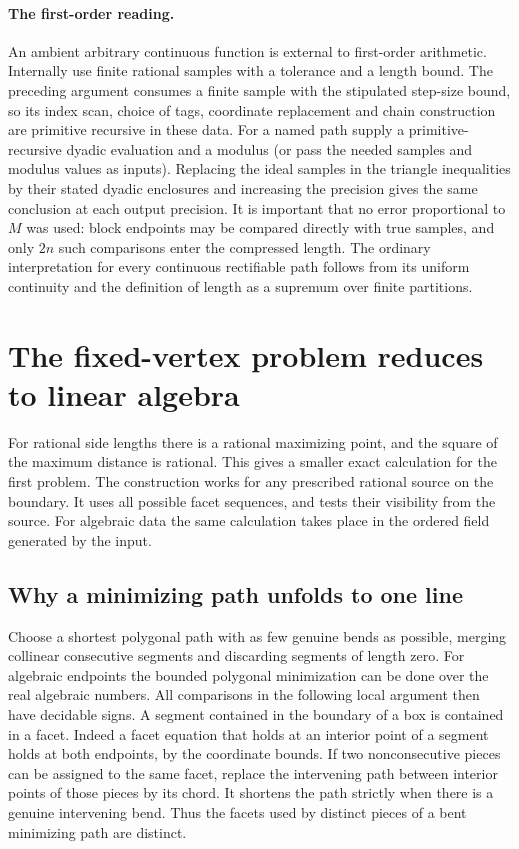 \documentclass[10pt,letterpaper]{article}
\begin{document}
\paragraph{The first-order reading.}
An ambient arbitrary continuous function is external to first-order
arithmetic. Internally use finite rational samples with a tolerance
and a length bound. The preceding argument consumes a finite sample
with the stipulated step-size bound, so its index scan, choice of tags,
coordinate replacement and chain construction are primitive recursive
in these data. For a named path supply a primitive-recursive dyadic
evaluation and a modulus (or pass the needed samples and modulus
values as inputs). Replacing the ideal samples in the triangle
inequalities by their stated dyadic enclosures and increasing the
precision gives the same conclusion at each output precision. It is
important that no error proportional to $M$ was used: block endpoints
may be compared directly with true samples, and only $2n$ such
comparisons enter the compressed length. The ordinary interpretation
for every continuous rectifiable path follows from its uniform
continuity and the definition of length as a supremum over finite
partitions.


\section{The fixed-vertex problem reduces to linear algebra}
\label{sec:fixedarr}
For rational side lengths there is a rational maximizing point, and the
square of the maximum distance is rational. This gives a smaller exact
calculation for the first problem. The construction works for any prescribed
rational source on the boundary. It uses all possible facet sequences, and
tests their visibility from the source. For algebraic data the same
calculation takes place in the ordered field generated by the input.

\subsection{Why a minimizing path unfolds to one line}
Choose a shortest polygonal path with as few genuine bends as possible,
merging collinear consecutive segments and discarding segments of length zero.
For algebraic endpoints the bounded polygonal minimization can be done over
the real algebraic numbers. All comparisons in the following local argument
then have decidable signs.
A segment contained in the boundary of a box is contained in a facet. Indeed a facet equation that holds at an interior point of a segment holds at
both endpoints, by the coordinate bounds. If two nonconsecutive pieces
can be assigned to the same facet, replace the intervening path between
interior points of those pieces by its chord. It shortens the path strictly
when there is a genuine intervening bend. Thus the facets used by distinct
pieces of a bent minimizing path are distinct.
\end{document}
